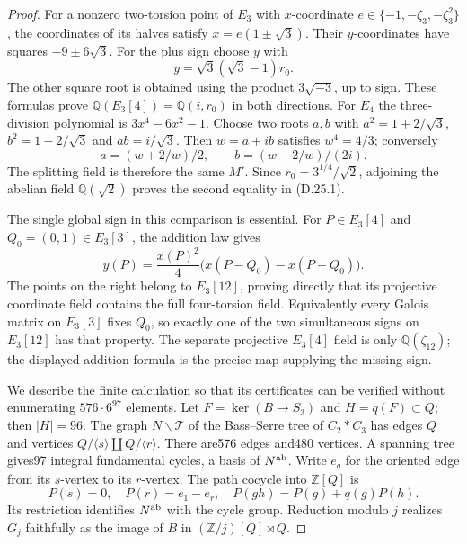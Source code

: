 \begin{proof}
For a nonzero two-torsion point of $E_3$ with $x$-coordinate
$e\in\{-1,-\zeta_3,-\zeta_3^2\}$, the coordinates of its halves
satisfy $x=e(1\pm\sqrt3)$. Their $y$-coordinates have squares
$-9\pm6\sqrt3$. For the plus sign choose $y$ with
\[
 y=\sqrt3(\sqrt3-1)r_0.
\]
The other square root is obtained using the product
$3\sqrt{-3}$, up to sign. These formulas prove
$\mathbb Q(E_3[4])=\mathbb Q(i,r_0)$ in both directions.
For $E_4$ the three-division polynomial is
$3x^4-6x^2-1$. Choose two roots $a,b$ with
$a^2=1+2/\sqrt3$, $b^2=1-2/\sqrt3$ and $ab=i/\sqrt3$.
Then $w=a+ib$ satisfies $w^4=4/3$; conversely
\[
 a=(w+2/w)/2,\qquad b=(w-2/w)/(2i).
\]
The splitting field is therefore the same $M'$. Since
$r_0=3^{1/4}/\sqrt2$, adjoining the abelian field
$\mathbb Q(\sqrt2)$ proves the second equality in (D.25.1).

The single global sign in this comparison is essential.
For $P\in E_3[4]$ and $Q_0=(0,1)\in E_3[3]$, the addition law gives
\[
 y(P)=\frac{x(P)^2}{4}
       \bigl(x(P-Q_0)-x(P+Q_0)\bigr).
\]
The points on the right belong to $E_3[12]$, proving directly
that its projective coordinate field contains the full
four-torsion field. Equivalently every Galois matrix on $E_3[3]$
fixes $Q_0$, so exactly one of the two simultaneous signs on
$E_3[12]$ has that property. The separate projective
$E_3[4]$ field is only $\mathbb Q(\zeta_{12})$; the displayed
addition formula is the precise map supplying the missing sign.

We describe the finite calculation so that its certificates
can be verified without enumerating $576\cdot6^{97}$ elements.
Let $F=\ker(B\to S_3)$ and $H=q(F)\subset Q$; then $|H|=96$.
The graph $N\backslash\mathcal T$ of the Bass--Serre tree of
$C_2*C_3$ has edges $Q$ and vertices
$Q/\langle s\rangle\amalg Q/\langle r\rangle$.
There are576 edges and480 vertices. A spanning tree gives97
integral fundamental cycles, a basis of $N^{\rm ab}$.
Write $e_q$ for the oriented edge from its $s$-vertex to its
$r$-vertex. The path cocycle into $\mathbb Z[Q]$ is
\[
 P(s)=0,\quad P(r)=e_1-e_r,\quad
 P(gh)=P(g)+q(g)P(h).                                    \tag{D.25.4}
\]
Its restriction identifies $N^{\rm ab}$ with the cycle group.
Reduction modulo $j$ realizes $G_j$ faithfully as the image
of $B$ in $(\mathbb Z/j)[Q]\rtimes Q$.


\end{proof}
